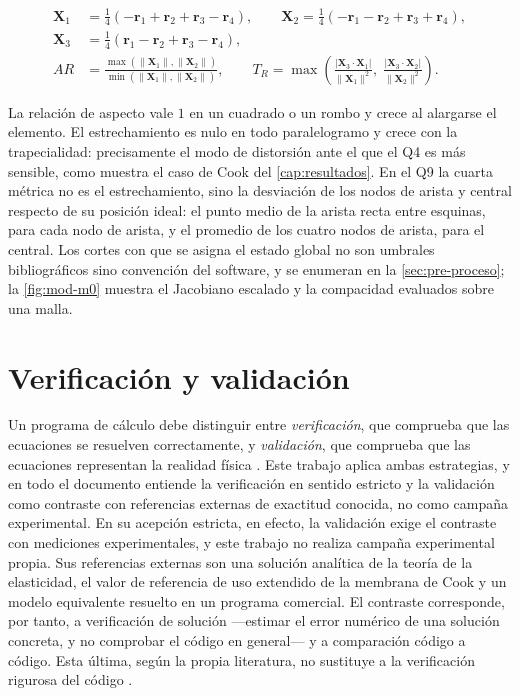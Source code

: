 \begin{equation}
\begin{aligned}
\bm{X}_1 &= \tfrac{1}{4}\left(-\bm{r}_1 + \bm{r}_2 + \bm{r}_3 - \bm{r}_4\right), \qquad
\bm{X}_2 = \tfrac{1}{4}\left(-\bm{r}_1 - \bm{r}_2 + \bm{r}_3 + \bm{r}_4\right), \\[2pt]
\bm{X}_3 &= \tfrac{1}{4}\left(\bm{r}_1 - \bm{r}_2 + \bm{r}_3 - \bm{r}_4\right), \\[4pt]
AR &= \frac{\max(\|\bm{X}_1\|, \|\bm{X}_2\|)}{\min(\|\bm{X}_1\|, \|\bm{X}_2\|)}, \qquad
T_R = \max\left(\frac{|\bm{X}_3 \cdot \bm{X}_1|}{\|\bm{X}_1\|^2},\; \frac{|\bm{X}_3 \cdot \bm{X}_2|}{\|\bm{X}_2\|^2}\right).
\end{aligned}
\label{eq:descomposicion-bilineal}
\end{equation}

La relación de aspecto vale $1$ en un cuadrado o un rombo y crece al alargarse el elemento. El estrechamiento es nulo en todo paralelogramo y crece con la trapecialidad: precisamente el modo de distorsión ante el que el Q4 es más sensible, como muestra el caso de Cook del \autoref{cap:resultados}. En el Q9 la cuarta métrica no es el estrechamiento, sino la desviación de los nodos de arista y central respecto de su posición ideal: el punto medio de la arista recta entre esquinas, para cada nodo de arista, y el promedio de los cuatro nodos de arista, para el central. Los cortes con que se asigna el estado global no son umbrales bibliográficos sino convención del software, y se enumeran en la \autoref{sec:pre-proceso}; la \autoref{fig:mod-m0} muestra el Jacobiano escalado y la compacidad evaluados sobre una malla.

\section{Verificación y validación}
\label{sec:verificacion-validacion}

Un programa de cálculo debe distinguir entre \emph{verificación}, que comprueba que las ecuaciones se resuelven correctamente, y \emph{validación}, que comprueba que las ecuaciones representan la realidad física \autocite[pp.~13-14]{oberkampf2010vv}. Este trabajo aplica ambas estrategias, y en todo el documento entiende la verificación en sentido estricto y la validación como contraste con referencias externas de exactitud conocida, no como campaña experimental. En su acepción estricta, en efecto, la validación exige el contraste con mediciones experimentales, y este trabajo no realiza campaña experimental propia. Sus referencias externas son una solución analítica de la teoría de la elasticidad, el valor de referencia de uso extendido de la membrana de Cook y un modelo equivalente resuelto en un programa comercial. El contraste corresponde, por tanto, a verificación de solución ---estimar el error numérico de una solución concreta, y no comprobar el código en general--- y a comparación código a código. Esta última, según la propia literatura, no sustituye a la verificación rigurosa del código \autocite[pp.~173-174]{oberkampf2010vv}.


